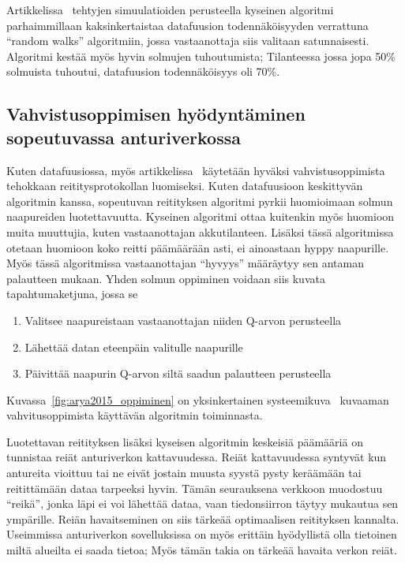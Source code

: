 Artikkelissa~\cite{Yu2006} tehtyjen simuulatioiden perusteella kyseinen
algoritmi parhaimmillaan kaksinkertaistaa datafuusion todennäköisyyden
verrattuna ``random walks'' algoritmiin, jossa vastaanottaja siis valitaan
satunnaisesti. Algoritmi kestää myös hyvin solmujen tuhoutumista; Tilanteessa
jossa jopa 50\% solmuista tuhoutui, datafuusion todennäköisyys oli 70\%.

\subsection{Vahvistusoppimisen hyödyntäminen sopeutuvassa anturiverkossa}

Kuten datafuusiossa, myös artikkelissa~\cite{Arya2015} käytetään hyväksi
vahvistusoppimista tehokkaan reititysprotokollan luomiseksi. Kuten datafuusioon
keskittyvän algoritmin kanssa, sopeutuvan reitityksen algoritmi pyrkii
huomioimaan solmun naapureiden luotettavuutta. Kyseinen algoritmi ottaa
kuitenkin myös huomioon muita muuttujia, kuten vastaanottajan akkutilanteen.
Lisäksi tässä algoritmissa otetaan huomioon koko reitti päämäärään asti, ei
ainoastaan hyppy naapurille. Myös tässä algoritmissa vastaanottajan ``hyvyys''
määräytyy sen antaman palautteen mukaan. Yhden solmun oppiminen voidaan siis
kuvata tapahtumaketjuna, jossa se
\begin{enumerate}
  \item Valitsee naapureistaan vastaanottajan niiden Q-arvon perusteella
  \item Lähettää datan eteenpäin valitulle naapurille
  \item Päivittää naapurin Q-arvon siltä saadun palautteen perusteella
\end{enumerate}
Kuvassa~\ref{fig:arya2015_oppiminen} on yksinkertainen
systeemikuva~\cite{Arya2015} kuvaaman vahvitusoppimista käyttävän algoritmin
toiminnasta.

Luotettavan reitityksen lisäksi kyseisen algoritmin keskeisiä päämääriä on
tunnistaa reiät anturiverkon kattavuudessa. Reiät kattavuudessa syntyvät kun
antureita vioittuu tai ne eivät jostain muusta syystä pysty keräämään tai
reitittämään dataa tarpeeksi hyvin. Tämän seurauksena verkkoon muodostuu
``reikä'', jonka läpi ei voi lähettää dataa, vaan tiedonsiirron täytyy mukautua
sen ympärille. Reiän havaitseminen on siis tärkeää optimaalisen reitityksen
kannalta. Useimmissa anturiverkon sovelluksissa on myös erittäin hyödyllistä
olla tietoinen miltä alueilta ei saada tietoa; Myös tämän takia on tärkeää
havaita verkon reiät.

